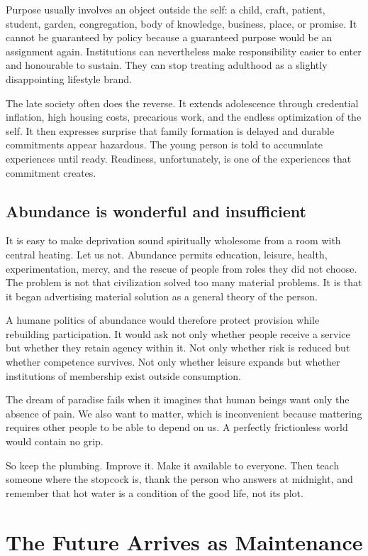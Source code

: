 \documentclass[12pt,a4paper]{book}
\begin{document}
Purpose usually involves an object outside the self: a child, craft, patient,
student, garden, congregation, body of knowledge, business, place, or promise.
It cannot be guaranteed by policy because a guaranteed purpose would be an
assignment again.  Institutions can nevertheless make responsibility easier
to enter and honourable to sustain.  They can stop treating adulthood as a
slightly disappointing lifestyle brand.

The late society often does the reverse.  It extends adolescence through
credential inflation, high housing costs, precarious work, and the endless
optimization of the self.  It then expresses surprise that family formation
is delayed and durable commitments appear hazardous.  The young person is
told to accumulate experiences until ready.  Readiness, unfortunately, is
one of the experiences that commitment creates.

\section{Abundance is wonderful and insufficient}

It is easy to make deprivation sound spiritually wholesome from a room with
central heating.  Let us not.  Abundance permits education, leisure, health,
experimentation, mercy, and the rescue of people from roles they did not
choose.  The problem is not that civilization solved too many material
problems.  It is that it began advertising material solution as a general
theory of the person.

A humane politics of abundance would therefore protect provision while
rebuilding participation.  It would ask not only whether people receive a
service but whether they retain agency within it.  Not only whether risk is
reduced but whether competence survives.  Not only whether leisure expands
but whether institutions of membership exist outside consumption.

The dream of paradise fails when it imagines that human beings want only the
absence of pain.  We also want to matter, which is inconvenient because
mattering requires other people to be able to depend on us.  A perfectly
frictionless world would contain no grip.

So keep the plumbing.  Improve it.  Make it available to everyone.  Then teach
someone where the stopcock is, thank the person who answers at midnight, and
remember that hot water is a condition of the good life, not its plot.

\chapter{The Future Arrives as Maintenance}
\label{chap:future-maintenance}
\end{document}
